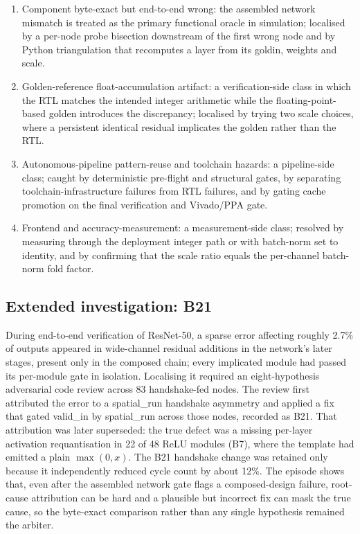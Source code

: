 \begin{enumerate}
\item Component byte-exact but end-to-end wrong: the assembled network mismatch is treated as the primary functional oracle in simulation; localised by a per-node probe bisection downstream of the first wrong node and by Python triangulation that recomputes a layer from its goldin, weights and scale.
\item Golden-reference float-accumulation artifact: a verification-side class in which the RTL matches the intended integer arithmetic while the floating-point-based golden introduces the discrepancy; localised by trying two scale choices, where a persistent identical residual implicates the golden rather than the RTL.
\item Autonomous-pipeline pattern-reuse and toolchain hazards: a pipeline-side class; caught by deterministic pre-flight and structural gates, by separating toolchain-infrastructure failures from RTL failures, and by gating cache promotion on the final verification and Vivado/PPA gate.
\item Frontend and accuracy-measurement: a measurement-side class; resolved by measuring through the deployment integer path or with batch-norm set to identity, and by confirming that the scale ratio equals the per-channel batch-norm fold factor.
\end{enumerate}

\subsection{Extended investigation: B21}

During end-to-end verification of ResNet-50, a sparse error affecting roughly 2.7\% of outputs appeared in wide-channel residual additions in the network's later stages, present only in the composed chain; every implicated module had passed its per-module gate in isolation. Localising it required an eight-hypothesis adversarial code review across 83 handshake-fed nodes. The review first attributed the error to a spatial\_run handshake asymmetry and applied a fix that gated valid\_in by spatial\_run across those nodes, recorded as B21. That attribution was later superseded: the true defect was a missing per-layer activation requantisation in 22 of 48 ReLU modules (B7), where the template had emitted a plain \(\max(0,x)\). The B21 handshake change was retained only because it independently reduced cycle count by about 12\%. The episode shows that, even after the assembled network gate flags a composed-design failure, root-cause attribution can be hard and a plausible but incorrect fix can mask the true cause, so the byte-exact comparison rather than any single hypothesis remained the arbiter.

